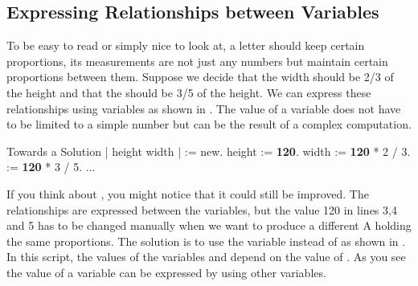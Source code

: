 \subsection{Expressing Relationships between Variables}
To be \newcommand{\replace}[2]{read efficiently}{easy to read} or simply \newcommand{\add}[1]{to be} nice to look at, a letter should \newcommand{\replace}[2]{respect}{keep}
certain proportions, \ie \newcommand{\replace}[2]{the lengths that describe it}{its measurements} are not
\newcommand{\replace}[2]{freely chosen}{just any numbers} but maintain certain proportions between them. \newcommand{\replace}[2]{Let us}{Suppose we} decide
that the width should be 2/3 of the height and that
the \dist should be \newcommand{\remove}[1]{at} 3/5 of the height. We can express these
relationships using variables\newcommand{\add}[1]{,} as shown in \newcommand{\remove}[1]{the following}
. \newcommand{\replace}[2]{Indeed the}{The} value of a variable does not have to be 
limited to a simple number but can be the result of a complex computation. 

\begin{scriptwithtitle}{Towards a Solution}\label{src:a100varl}
| \caro height width \dist|
\caro := \Turtle new.
height := \textbf{120}.
width := \textbf{120} * 2 / 3.
\dist := \textbf{120} * 3 / 5.
...
\end{scriptwithtitle}

If you \newcommand{\replace}[2]{analyze a bit the}{think about} , \newcommand{\replace}[2]{you realize}{you might notice} that it \newcommand{\replace}[2]{is not optimal}{could still be improved}. The relationships are expressed between the variables, but \newcommand{\remove}[1]{still} the value 120 in lines 3,4 and 5 \newcommand{\add}[1]{still} has to be changed manually when we want to produce a different A holding the same \newcommand{\replace}[2]{relations}{proportions}.  \newcommand{\add}[1]{\paragraph
}
The solution is to use the variable  instead of \newcommand{\add}[1]{,} as shown in
\newcommand{\remove}[1]{the} . In this script, the \newcommand{\replace}[2]{value}{values} of the variables  and \ct{\dist} \newcommand{\replace}[2]{depends}{depend} on the \newcommand{\replace}[2]{one}{value} of . As you see
the value of a variable can be expressed by using other variables. 

